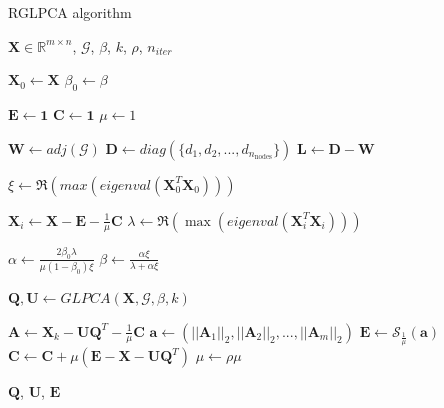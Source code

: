 \documentclass[sigconf]{acmart}
\begin{document}
  
  \begin{algorithm}[H]
  \caption{RGLPCA algorithm}\label{alg:rglpca}
  \begin{algorithmic}
      \Require $\mathbf{X} \in \mathbb{R}^{m \times n}$, $\mathcal{G}$, $\beta$, $k$, $\rho$, $n_{iter}$
      
      \State $\mathbf{X}_0 \gets \mathbf{X}$
      \State $\beta_0 \gets \beta$
      
      \State $\mathbf{E} \gets \bm{1}$
      \State $\mathbf{C} \gets \bm{1}$
      \State $\mu \gets 1$
      
      \State $\mathbf{W} \gets adj(\mathcal{G})$
      \State $\mathbf{D} \gets diag(\{d_1, d_2, ..., d_{n_{\text{nodes}}}\})$
      \State $\mathbf{L} \gets \mathbf{D} - \mathbf{W}$
      
      \State $\xi \gets \Re(max(eigenval(\mathbf{X}_0^T \mathbf{X}_0)))$
      
          \State $\mathbf{X}_i \gets \mathbf{X} - \mathbf{E} - \frac{1}{\mu}\mathbf{C}$
          \State $\lambda \gets \Re(\max(eigenval(\mathbf{X}_i^T \mathbf{X}_i)))$
      
          \State $\alpha \gets \frac{2 \beta_0 \lambda}{\mu (1 - \beta_0)\xi}$
          \State $\beta \gets \frac{\alpha \xi}{\lambda + \alpha \xi}$
      
          \State $\mathbf{Q}, \mathbf{U} \gets GLPCA(\mathbf{X}, \mathcal{G}, \beta, k)$
      
          \State $\mathbf{A} \gets \mathbf{X}_k - \mathbf{UQ}^T - \frac{1}{\mu} \mathbf{C}$
          \State $\mathbf{a} \gets (||\mathbf{A}_1||_2, ||\mathbf{A}_2||_2, ..., ||\mathbf{A}_m||_2)$
          \State $\mathbf{E} \gets \mathcal{S}_{\frac{1}{\mu}}(\mathbf{a})$
          \State $\mathbf{C} \gets \mathbf{C} + \mu(\mathbf{E} - \mathbf{X} - \mathbf{UQ}^T)$
          \State $\mu \gets \rho \mu$
          
      \EndFor
      
      \State \Return $\mathbf{Q}$, $\mathbf{U}$, $\mathbf{E}$
  \end{algorithmic}
  \end{algorithm}
  
\end{document}
